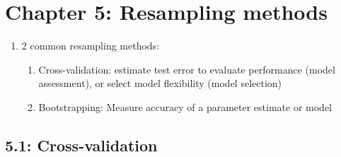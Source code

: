 \documentclass{article}
\begin{document}
\section*{Chapter 5: Resampling methods} 

\begin{enumerate}
\item 2 common resampling methods: 
\begin{enumerate}
\item Cross-validation: estimate test error to evaluate performance (model assessment), or select model flexibility (model selection)
\item Bootstrapping: Measure accuracy of a parameter estimate or model
\end{enumerate}

\end{enumerate}

\subsection*{5.1: Cross-validation}
\end{document}
